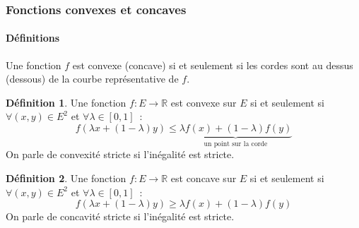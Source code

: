 \documentclass[10pt,notheorems]{beamer}
\theoremstyle{plain}
\theoremstyle{definition} %
\newtheorem{definition}{Définition}
\begin{document}
\begin{frame}
  \frametitle{Fonctions convexes et concaves}
  \framesubtitle{Définitions}
  \hypertarget{slide_fonctions_convexes_1}{}
  \bigskip Une fonction $f$ est convexe (concave) si et seulement si
  les cordes sont au dessus (dessous) de la courbe représentative de
  $f$.\newline

  \begin{definition}\label{def:convexe}
    Une fonction $f:E\rightarrow \mathbb R$ est convexe sur $E$ si et seulement si $\forall (x,y)\in E^2$ et $\forall \lambda\in[0,1]$~:
    \[
      f(\lambda x + (1-\lambda)y) \leq \underbrace{\lambda f(x) + (1-\lambda)f(y)}_{\text{un point sur la corde}}
    \]
    On parle de convexité stricte si l'inégalité est stricte.
  \end{definition}

  \bigskip

  \begin{definition}\label{def:concave}
    Une fonction $f:E\rightarrow \mathbb R$ est concave sur $E$ si et seulement si $\forall (x,y)\in E^2$ et $\forall \lambda\in[0,1]$~:
    \[
      f(\lambda x + (1-\lambda)y) \geq \lambda f(x) + (1-\lambda)f(y)
    \]
    On parle de concavité stricte si l'inégalité est stricte.
  \end{definition}

\end{frame}
\end{document}
